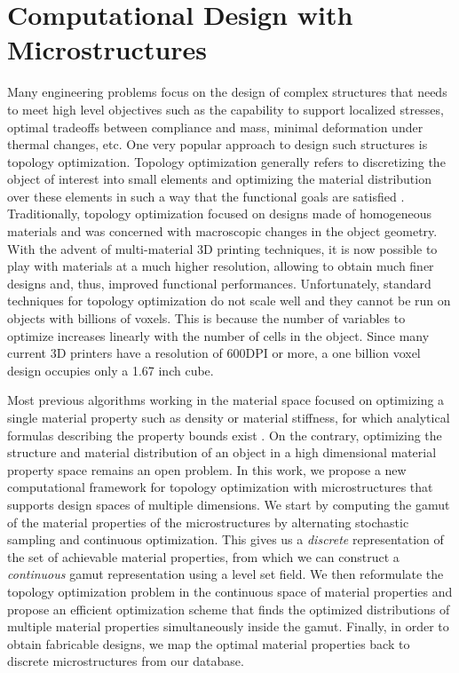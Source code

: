 \chapter{Computational Design with Microstructures}
\label{ch3:topopt}
Many engineering problems focus on the design of complex structures that needs to meet high level objectives such as the capability to support localized stresses, optimal tradeoffs between compliance and mass, minimal deformation under thermal changes, etc. One very popular approach to design such structures is topology optimization.
Topology optimization generally refers to discretizing the object of interest into small elements and optimizing the material distribution over these elements in such a way that the functional goals are satisfied \cite{bendsoe2004topology}. Traditionally, topology optimization focused on designs made of homogeneous materials and was concerned with macroscopic changes in the object geometry.
With the advent of multi-material 3D printing techniques, it is now possible to play with materials at a much higher resolution, allowing to obtain much finer designs and, thus, improved functional performances.
Unfortunately, standard techniques for topology optimization do not scale well and they cannot be run on objects with billions of voxels. This is because the number of variables to optimize increases linearly with the number of cells in the object. Since many current 3D printers have a resolution of 600DPI or more, a one billion voxel design occupies only a 1.67 inch cube.

Most previous algorithms working in the material space focused on optimizing a single material property such as density or material stiffness, for which analytical formulas describing the property bounds exist \cite{Allaire93Bounds}. On the contrary, optimizing the structure and material distribution of an object in a high dimensional material property space remains an open problem. In this work, we propose a new computational framework for topology optimization with microstructures that supports design spaces of multiple dimensions. We start by computing the gamut of the material properties of the microstructures by alternating stochastic sampling and continuous optimization. This gives us a {\it discrete} representation of the set of achievable material properties, from which we can construct a {\it continuous} gamut representation using a level set field. We then reformulate the topology optimization problem in the continuous space of material properties and propose an efficient optimization scheme that finds the optimized distributions of multiple material properties simultaneously inside the gamut.
Finally, in order to obtain fabricable designs, we map the optimal material properties back to discrete microstructures from our database.

